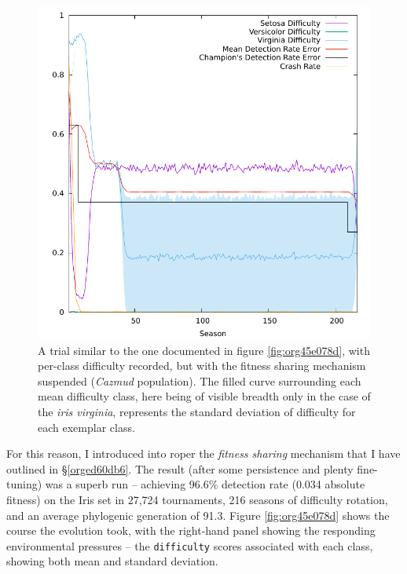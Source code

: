 \documentclass[12pt,glossary]{dalthesis}
\begin{document}
\begin{figure}[htbp]
\centering
\includegraphics[width=.9\linewidth]{../images/plots/nosharing.pdf}
\caption{\label{fig:orgf01bfa4}
A trial similar to the one documented in figure \ref{fig:org45e078d}, with per-class difficulty recorded, but with the fitness sharing mechanism suspended (\emph{Cazmud} population). The filled curve surrounding each mean difficulty class, here being of visible breadth only in the case of the \emph{iris virginia}, represents the standard deviation of difficulty for each exemplar class.}
\end{figure}

For this reason, I introduced into \gls{roper} the \emph{fitness sharing} mechanism 
that I have outlined in \S \ref{orged60db6}. 
 The result (after some persistence and plenty fine-tuning) was a superb run --
achieving 96.6\% detection rate (0.034 absolute fitness) on the Iris set in
27,724 tournaments, 216 seasons of difficulty rotation, and an average
phylogenic generation of 91.3. Figure \ref{fig:org45e078d} shows the course the
evolution took, with the right-hand panel showing the responding environmental
pressures -- the \texttt{difficulty} scores associated with each class, showing both
mean and standard deviation.
\end{document}
